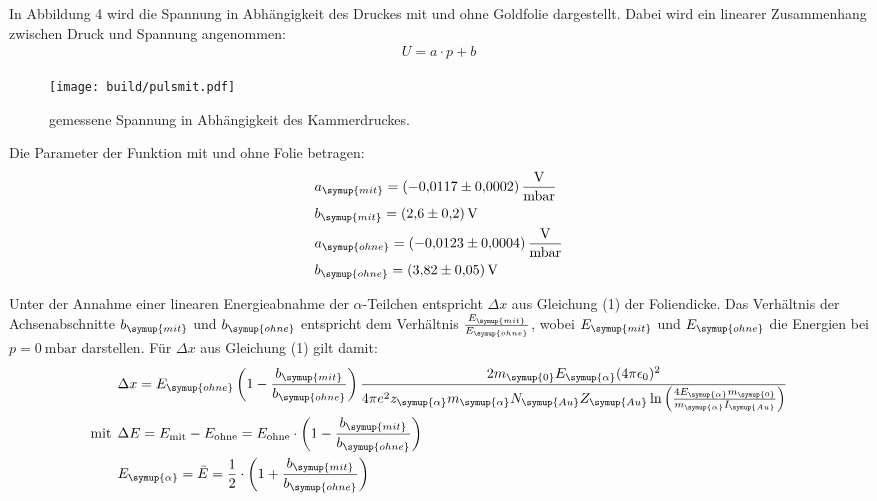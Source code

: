 In Abbildung 4 wird  die Spannung in Abhängigkeit des Druckes mit und ohne Goldfolie dargestellt. Dabei wird ein linearer
Zusammenhang zwischen Druck und Spannung angenommen:
\begin{align*}
  U = a \cdot p + b
\end{align*}

\begin{figure}[H]
  \centering
  \texttt{[image: build/pulsmit.pdf]}
  \caption{gemessene Spannung in Abhängigkeit des Kammerdruckes.}
  \label{fig:ohne}
\end{figure}

Die Parameter der Funktion mit und ohne Folie betragen:
\begin{align*}
  &a_{\symup{mit}} = \SI{-0.0117(2)}{\volt\per\milli\bar}  \\
  &b_{\symup{mit}} = \SI{2.6(2)}{\volt}  \\
  &a_{\symup{ohne}}= \SI{-0.0123(4)}{\volt\per\milli\bar}  \\
  &b_{\symup{ohne}} = \SI{ 3.82(5)}{\volt} \\
\end{align*}

Unter der Annahme einer linearen Energieabnahme der $\alpha$-Teilchen entspricht $\Delta x$ aus Gleichung (1) der Foliendicke.
Das Verhältnis der Achsenabschnitte $b_{\symup{mit}}$ und $b_{\symup{ohne}}$ entspricht dem Verhältnis $\frac{E_{\symup{mit}}}{E_{\symup{ohne}}}$, wobei
$E_{\symup{mit}}$ und $E_{\symup{ohne}}$ die Energien bei $p=\SI{0}{\milli\bar}$ darstellen.
Für $\Delta x$ aus Gleichung (1) gilt damit:
\begin{align}
  &\Delta x = E_{\symup{ohne}} \left(1- \frac{b_{\symup{mit}}}{b_{\symup{ohne}}}\right) \frac{2 m_{\symup{0}} E_{\symup{\alpha}} (4 \pi \epsilon_0)^2}{4 \pi e^2 z_{\symup{\alpha}}  m_{\symup{\alpha}} N_{\symup{Au}} Z_{\symup{Au}} \ln{\left(\frac{4 E_{\symup{\alpha}} m_{\symup{0}}}{m_{\symup{\alpha}} I_{\symup{Au}}}\right)}} \\
  \text{mit} \:\: &\Delta E = E_{\mathrm{mit}} - E_{\mathrm{ohne}} = E_{\mathrm{ohne}} \cdot \left(1- \frac{b_{\symup{mit}}}{b_{\symup{ohne}}}\right) \\
  &E_{\symup{\alpha}} = \bar{E} = \frac{1}{2} \cdot \left(1+ \frac{b_{\symup{mit}}}{b_{\symup{ohne}}}\right)
\end{align}


